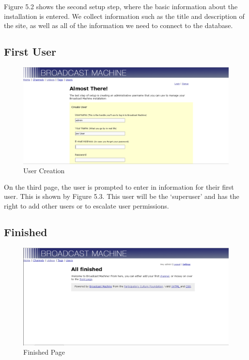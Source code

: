\documentclass[a4paper,12pt]{report}
\newcommand{\scare}[1]{`#1'}
\begin{document}
Figure 5.2 shows the second setup step, where the basic information about the installation is entered.
We collect information such as the title and description of the site, as well as all of the information we need to connect to the database.

\subsection{First User}
\begin{figure}[htp]
\begin{center}
\includegraphics[width=150mm]{./images/setup3.png}
\caption{User Creation}
\end{center}
\end{figure}
On the third page, the user is prompted to enter in information for their first user. This is shown by Figure 5.3.
This user will be the \scare{superuser} and has the right to add other users or to escalate user permissions.

\subsection{Finished}
\begin{figure}[htp]
\begin{center}
\includegraphics[width=150mm]{./images/setup4.png}
\caption{Finished Page}
\end{center}
\end{figure}
\end{document}
